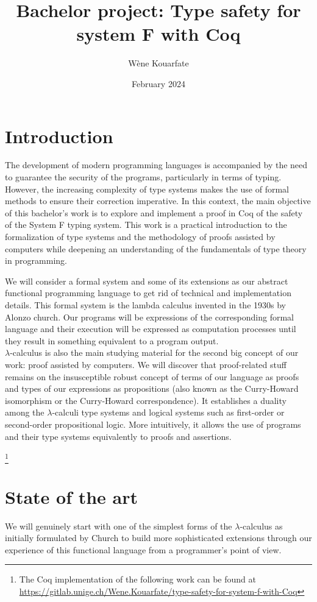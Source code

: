 \documentclass{article}
\title{Bachelor project: Type safety for system F with Coq}
\author{Wène Kouarfate}
\date{February 2024}
\begin{document}
\maketitle

\tableofcontents
\newpage

\section{Introduction}
The development of modern programming languages is accompanied by the need to guarantee the security of the programs, particularly in terms of typing. However, the increasing complexity of type systems makes the use of formal methods to ensure their correction imperative. In this context, the main objective of this bachelor's work is to explore and implement a proof in Coq of the safety of the System F typing system. This work is a practical introduction to the formalization of type systems and the methodology of proofs assisted by computers while deepening an understanding of the fundamentals of type theory in programming.\par
We will consider a formal system and some of its extensions as our abstract functional programming language to get rid of technical and implementation details. This formal system is the lambda calculus invented in the 1930s by Alonzo church. Our programs will be expressions of the corresponding formal language and their execution will be expressed as computation processes until they result in something equivalent to a program output.\\
$\lambda$-calculus is also the main studying material for the second big concept of our work: proof assisted by computers. We will discover that proof-related stuff remains on the insusceptible robust concept of terms of our language as proofs and types of our expressions as propositions (also known as the Curry-Howard isomorphism or the Curry-Howard correspondence). It establishes a duality among the $\lambda$-calculi type systems and logical systems such as first-order or second-order propositional logic. More intuitively, it allows the use of programs and their type systems equivalently to proofs and assertions.\par
\footnote{The Coq implementation of the following work can be found at \url{https://gitlab.unige.ch/Wene.Kouarfate/type-safety-for-system-f-with-Coq}}

\section{State of the art}
We will genuinely start with one of the simplest forms of the $\lambda$-calculus as initially formulated by Church to build more sophisticated extensions through our experience of this functional language from a programmer's point of view.
\end{document}
